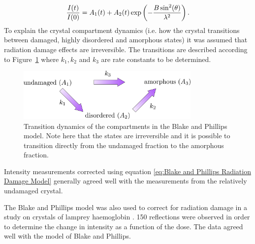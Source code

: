         \begin{equation}
            \frac{I(t)}{I(0)} = A_1(t) + A_2(t) \exp\left(-\frac{B\sin^2(\theta)}{\lambda^2} \right).
            \label{eq:Blake and Phillips Radiation Damage Model}
        \end{equation}
        To explain the crystal compartment dynamics (i.e. how the crystal transitions between damaged, highly disordered and amorphous states) it was assumed that radiation damage effects are irreversible.
        The transitions are described according to Figure~\ref{fig:Crystal Compartments Blake and Phillips} where $k_1, k_2$ and $k_3$ are rate constants to be determined.
        \begin{figure}[H]
            \centering
            \includegraphics[width=0.8\textwidth]{figures/introduction/crystalcompartments_BP.pdf}
            \caption{Transition dynamics of the compartments in the Blake and Phillips model.
            Note here that the states are irreversible and it is possible to transition directly from the undamaged fraction to the amorphous fraction.}
            \label{fig:Crystal Compartments Blake and Phillips}
        \end{figure}
        Intensity measurements corrected using equation \ref{eq:Blake and Phillips Radiation Damage Model} generally agreed well with the measurements from the relatively undamaged crystal.

        The Blake and Phillips model was also used to correct for radiation damage in a study on crystals of lamprey haemoglobin \cite{hendrickson1973}.
        150 reflections were observed in order to determine the change in intensity as a function of the dose.
        The data agreed well with the model of Blake and Phillips.


